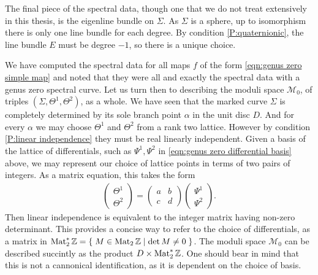 The final piece of the spectral data, though one that we do not treat extensively in this thesis, is the eigenline bundle on $Σ$. As $Σ$ is a sphere, up to isomorphism there is only one line bundle for each degree. By condition \ref{P:quaternionic}, the line bundle $E$ must be degree $-1$, so there is a unique choice.





We have computed the spectral data for all maps $f$ of the form \eqref{eqn:genus zero simple map} and noted that they were all and exactly the spectral data with a genus zero spectral curve. Let us turn then to describing the moduli space $\mathcal{M}_0$, of triples $(Σ,Θ^1,Θ^2)$, as a whole. We have seen that the marked curve $Σ$ is completely determined by its sole branch point $α$ in the unit disc $D$. And for every $α$ we may choose $Θ^1$ and $Θ^2$ from a rank two lattice. However by condition \ref{P:linear independence} they must be real linearly independent. Given a basis of the lattice of differentials, such as $Ψ^1, Ψ^2$ in \eqref{eqn:genus zero differential basis} above, we may represent our choice of lattice points in terms of two pairs of integers. As a matrix equation, this takes the form
\begin{align*}
\begin{pmatrix}
Θ^1 \\ Θ^2
\end{pmatrix}
=
\begin{pmatrix}
a & b \\
c & d
\end{pmatrix}
\begin{pmatrix}
Ψ^1 \\ Ψ^2
\end{pmatrix}.
\end{align*}
Then linear independence is equivalent to the integer matrix having non-zero determinant. This provides a concise way to refer to the choice of differentials, as a matrix in $\Mat_2^*\Z = \Set{ M \in \Mat_2\Z }{\det M \neq 0}$. The moduli space $\mathcal{M}_0$ can be described succintly as the product $D \times \Mat_2^*\Z$. One should bear in mind that this is not a cannonical identification, as it is dependent on the choice of basis.

